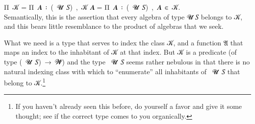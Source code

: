 \ad Π~\ab 𝒦 \hskip1mm = \hskip1mm \ad Π~\ab 𝑨~\af ꞉~(~\ab 𝓤~\ab 𝑆)~,~\ab 𝒦 𝑨
             \hskip1mm = \hskip1mm\ad Π~\ab 𝑨~\af ꞉~(~\ab 𝓤~\ab 𝑆)~,~\ab 𝑨~\af ∈~\ab 𝒦.\\[4pt]
Semantically, this is the assertion that every algebra of type  \ab 𝓤 \ab 𝑆 belongs to \ab 𝒦, and this bears little resemblance to the product of algebras that we seek.

What we need is a type that serves to index the class \ab 𝒦, and a function \af 𝔄 that maps an index to the inhabitant of \ab 𝒦 at that index. But \ab 𝒦 is a predicate (of type (~\ab 𝓤~\ab 𝑆)~\as →~\ab 𝓦\af ̇) and the type ~\ab 𝓤~\ab 𝑆 seems rather nebulous in that there is no natural indexing class with which to ``enumerate'' all inhabitants of ~\ab 𝓤~\ab 𝑆 that belong to \ab 𝒦.\footnote{%
If you haven't already seen this before, do yourself a favor and give it some thought; see if the correct type comes to you organically.}


